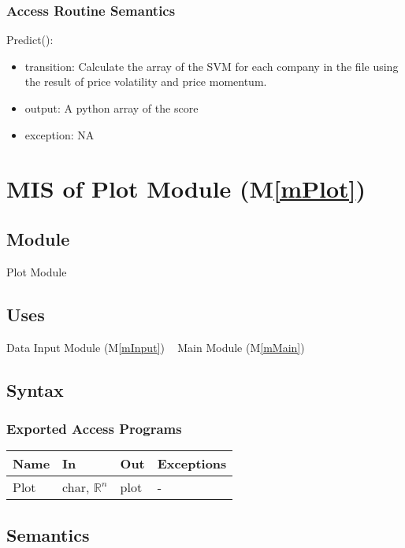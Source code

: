 \documentclass[12pt, titlepage]{article}
\newcommand{\mref}[1]{M\ref{#1}}
\begin{document}
\subsubsection{Access Routine Semantics}

\noindent Predict():
\begin{itemize}
\item transition: Calculate the array of the SVM for each company in the file using the result of price volatility and price momentum.
\item output: A python array of the score
\item exception: NA
\end{itemize}


\section{MIS of Plot Module (\mref{mPlot}) } 

\subsection{Module}
Plot Module
\subsection{Uses}
Data Input Module (\mref{mInput})
~\newline
Main Module (\mref{mMain})
\subsection{Syntax}

\subsubsection{Exported Access Programs}

\begin{center}
\begin{tabular}{p{2cm} p{4cm} p{2cm} p{2cm}}
\hline
\textbf{Name} & \textbf{In} & \textbf{Out} & \textbf{Exceptions} \\
\hline

Plot & char, $\mathbb{R}^n$ &plot &- \\

\hline
\end{tabular}
\end{center}

\subsection{Semantics}
\end{document}

